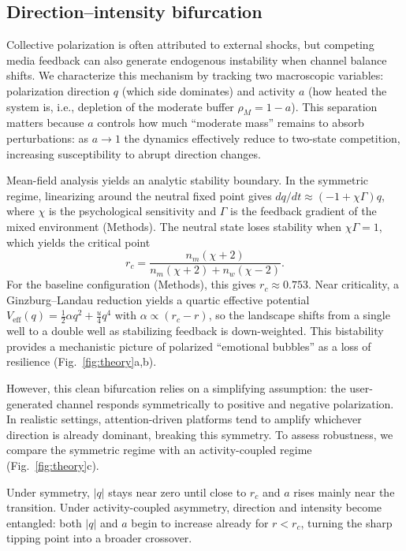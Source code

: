 \documentclass[12pt]{article}
\begin{document}
\subsection{Direction--intensity bifurcation}
\label{sec:direction-intensity-bifurcation}
Collective polarization is often attributed to external shocks, but competing media feedback can also generate endogenous instability when channel balance shifts. We characterize this mechanism by tracking two macroscopic variables: polarization direction $q$ (which side dominates) and activity $a$ (how heated the system is, i.e., depletion of the moderate buffer $\rho_M=1-a$). This separation matters because $a$ controls how much ``moderate mass'' remains to absorb perturbations: as $a\to 1$ the dynamics effectively reduce to two-state competition, increasing susceptibility to abrupt direction changes.

Mean-field analysis yields an analytic stability boundary. In the symmetric regime, linearizing around the neutral fixed point gives $dq/dt\approx(-1+\chi\Gamma)q$, where $\chi$ is the psychological sensitivity and $\Gamma$ is the feedback gradient of the mixed environment (Methods). The neutral state loses stability when $\chi\Gamma=1$, which yields the critical point
\begin{equation}
r_c=\frac{n_m(\chi+2)}{n_m(\chi+2)+n_w(\chi-2)}.
\label{eq:rc}
\end{equation}
For the baseline configuration (Methods), this gives $r_c\approx 0.753$. Near criticality, a Ginzburg--Landau reduction yields a quartic effective potential $V_{\text{eff}}(q)=\tfrac{1}{2}\alpha q^2+\tfrac{u}{4}q^4$ with $\alpha\propto(r_c-r)$, so the landscape shifts from a single well to a double well as stabilizing feedback is down-weighted. This bistability provides a mechanistic picture of polarized ``emotional bubbles'' as a loss of resilience (Fig.~\ref{fig:theory}a,b).

However, this clean bifurcation relies on a simplifying assumption: the user-generated channel responds symmetrically to positive and negative polarization. In realistic settings, attention-driven platforms tend to amplify whichever direction is already dominant, breaking this symmetry. To assess robustness, we compare the symmetric regime with an activity-coupled regime (Fig.~\ref{fig:theory}c).

Under symmetry, $|q|$ stays near zero until close to $r_c$ and $a$ rises mainly near the transition. Under activity-coupled asymmetry, direction and intensity become entangled: both $|q|$ and $a$ begin to increase already for $r<r_c$, turning the sharp tipping point into a broader crossover.
\end{document}
